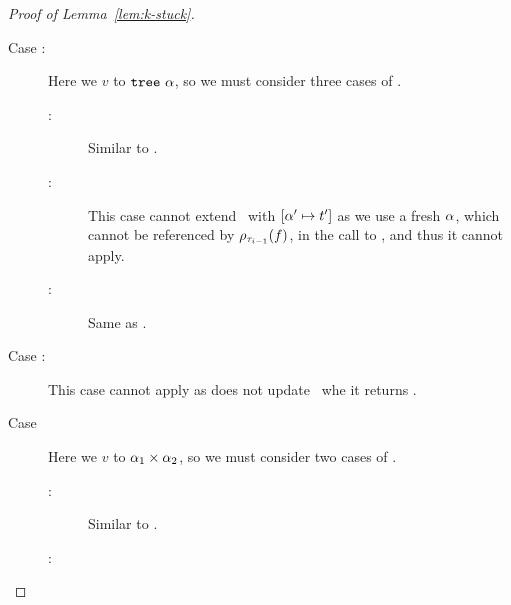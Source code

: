 \begin{proof}[Proof of Lemma~\ref{lem:k-stuck}]
\begin{description}
    \item[Case :]
      Here we \forcesym $v$ to $\mathtt{tree}\ \alpha$,
      so we must consider three cases of \forcesym.
      \begin{description}
      \item[:]
        Similar to \replusgood.
      \item[:]
        This case cannot extend \tsu\ with $[\alpha' \mapsto t']$ as we
        use a fresh $\alpha$, which cannot be referenced by
        $\rho_{\tau_{i-1}}(f)$, in the call to \forcesym, and thus it
        cannot apply.
      \item[:]
        Same as .
      \end{description}
    \item[Case \recasebad:]
      This case cannot apply as \forcesym does not update \tsu\ whe
      it returns \stuck.
    \item[Case \repcasegood]
      Here we \forcesym $v$ to $\alpha_1 \times \alpha_2$,
      so we must consider two cases of \forcesym.
      \begin{description}
      \item[:]
        Similar to \replusgood.
      \item[:]

\end{description}
\end{description}
\end{proof}
